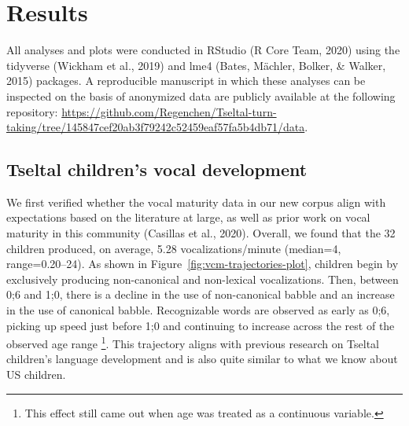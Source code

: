 \documentclass[
  man]{apa6}
\begin{document}
\hypertarget{results}{%
\section{Results}\label{results}}

All analyses and plots were conducted in RStudio (R Core Team, 2020) using the tidyverse (Wickham et al., 2019) and lme4 (Bates, Mächler, Bolker, \& Walker, 2015) packages. A reproducible manuscript in which these analyses can be inspected on the basis of anonymized data are publicly available at the following repository: \url{https://github.com/Regenchen/Tseltal-turn-taking/tree/145847cef20ab3f79242c52459eaf57fa5b4db71/data}.

\hypertarget{tseltal-childrens-vocal-development}{%
\subsection{Tseltal children's vocal development}\label{tseltal-childrens-vocal-development}}

We first verified whether the vocal maturity data in our new corpus align with expectations based on the literature at large, as well as prior work on vocal maturity in this community (Casillas et al., 2020). Overall, we found that the 32 children produced, on average, 5.28 vocalizations/minute (median=4, range=0.20--24). As shown in Figure~\ref{fig:vcm-trajectories-plot}, children begin by exclusively producing non-canonical and non-lexical vocalizations. Then, between 0;6 and 1;0, there is a decline in the use of non-canonical babble and an increase in the use of canonical babble. Recognizable words are observed as early as 0;6, picking up speed just before 1;0 and continuing to increase across the rest of the observed age range \footnote{This effect still came out when age was treated as a continuous variable.}. This trajectory aligns with previous research on Tseltal children's language development and is also quite similar to what we know about US children.
\end{document}
